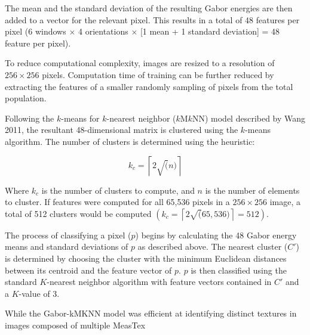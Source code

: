 
The mean and the standard deviation of the resulting Gabor energies are then
added to a vector for the relevant pixel. This results in a total of 48 features
per pixel (6 windows $\times$ 4 orientations $\times$ [1 mean + 1 standard deviation] = 48
feature per pixel).\par

To reduce computational complexity, images are resized to a resolution of
$256\times256$ pixels. Computation time of training can be further reduced by
extracting the features of a smaller randomly sampling of pixels from the
total population.

Following the $k$-means for $k$-nearest neighbor
($k$M$k$NN) model described by Wang 2011, the resultant 48-dimensional
matrix is clustered using the $k$-means algorithm. The number of
clusters is determined using the heuristic:

$$
k_c = \left \lceil{2\sqrt(n)}\right \rceil
$$

Where $k_c$ is the number of clusters to compute, and $n$
is the number of elements to cluster. If features were computed for all 65,536
pixels in a $256\times256$ image, a total of 512 clusters would be computed
$\left(k_c = \left \lceil{2\sqrt(65,536)}\right \rceil = 512\right)$.

The process of classifying a pixel ($p$) begins by calculating the 48 Gabor
energy means and standard deviations of $p$ as described above. The nearest
cluster ($C'$) is determined by choosing the cluster with the minimum Euclidean
distances between its centroid and the feature vector of $p$. $p$ is then
classified using the standard $K$-nearest neighbor algorithm with
feature vectors contained in $C'$ and a $K$-value of 3.

While the Gabor-kMKNN model was efficient at identifying distinct textures in
images composed of multiple MeasTex
